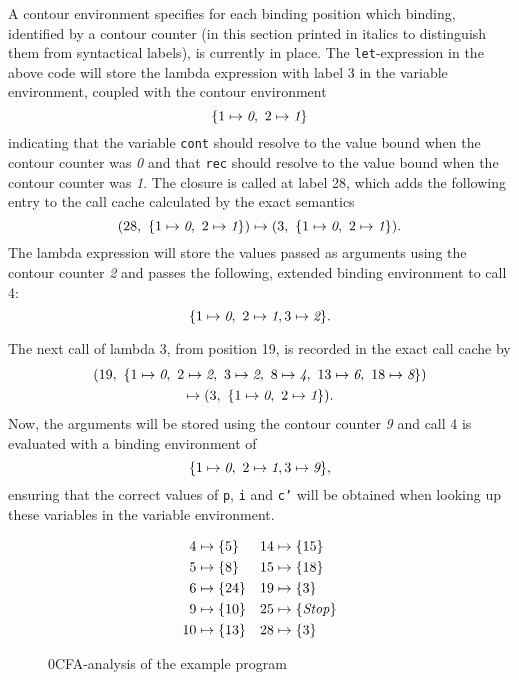 \documentclass[a4paper,parskip=half,BCOR=8mm,DIV=calc,12pt]{scrbook}
\begin{document}
A contour environment specifies for each binding position which binding, identified by a contour counter (in this section printed in italics to distinguish them from syntactical labels), is currently in place. The \texttt{let}-expression in the above code will store the lambda expression with label 3 in the variable environment, coupled with the contour environment
\[
\{ 1 \mapsto \textit 0,\ 2 \mapsto \textit 1 \}
\]
indicating that the variable \texttt{cont} should resolve to the value bound when the contour counter was \textit 0 and that \texttt{rec} should resolve to the value bound when the contour counter was \textit 1. The closure is called at label 28, which adds the following entry to the call cache calculated by the exact semantics
\[
(28,\ \{ 1 \mapsto \textit 0,\ 2 \mapsto \textit 1 \}) \mapsto (3,\ \{ 1 \mapsto \textit 0,\ 2 \mapsto \textit 1 \}).
\]
The lambda expression will store the values passed as arguments using the contour counter \textit 2 and passes the following, extended binding environment to call 4:
\[
\{ 1 \mapsto \textit 0,\ 2 \mapsto \textit 1, 3 \mapsto \textit 2\}.
\]

The next call of lambda 3, from position 19, is recorded in the exact call cache by
\begin{multline*}
(19,\ \{ 1\mapsto \textit 0,\ 2\mapsto \textit 2,\ 3\mapsto \textit 2,\ 8\mapsto \textit 4,\ 13\mapsto \textit 6,\ 18\mapsto \textit 8\}) \\ \mapsto (3,\ \{ 1 \mapsto \textit 0,\ 2 \mapsto \textit 1 \}).
\end{multline*}
Now, the arguments will be stored using the contour counter \textit 9 and call 4 is evaluated with a binding environment of 
\[
\{ 1 \mapsto \textit 0,\ 2 \mapsto \textit 1, 3 \mapsto \textit 9\},
\]
ensuring that the correct values of \texttt{p}, \texttt{i} and \texttt{c'} will be obtained when looking up these variables in the variable environment.

\begin{figure}
\begin{framed}
\vspace{-1em}
\begin{align*}
4 &\mapsto \{5\}
& 14 &\mapsto \{15\}\\
5 &\mapsto \{8\}
& 15 &\mapsto \{18\}\\
6 &\mapsto \{24\}
& 19 &\mapsto \{3\}\\
9 &\mapsto \{10\}
& 25 &\mapsto \{\text{\textit{Stop}}\}\\
10 &\mapsto \{13\}
& 28 &\mapsto \{3\}
\end{align*}
\end{framed}
\caption{0CFA-analysis of the example program}
\label{fig:examplecfa0}
\end{figure}
\end{document}
